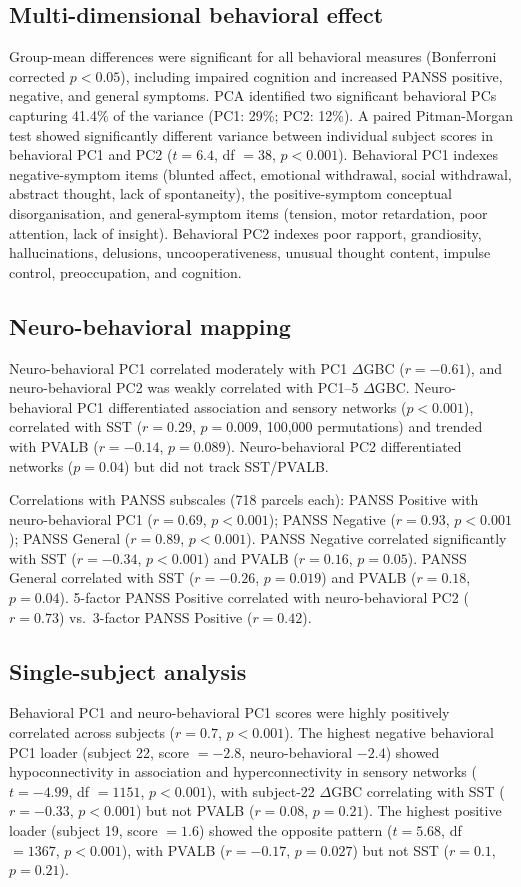\documentclass[11pt]{article}
\begin{document}
\subsection{Multi-dimensional behavioral effect}
Group-mean differences were significant for all behavioral measures (Bonferroni corrected $p<0.05$), including impaired cognition and increased PANSS positive, negative, and general symptoms. PCA identified two significant behavioral PCs capturing 41.4\% of the variance (PC1: 29\%; PC2: 12\%). A paired Pitman-Morgan test showed significantly different variance between individual subject scores in behavioral PC1 and PC2 ($t=6.4$, df $=38$, $p<0.001$). Behavioral PC1 indexes negative-symptom items (blunted affect, emotional withdrawal, social withdrawal, abstract thought, lack of spontaneity), the positive-symptom conceptual disorganisation, and general-symptom items (tension, motor retardation, poor attention, lack of insight). Behavioral PC2 indexes poor rapport, grandiosity, hallucinations, delusions, uncooperativeness, unusual thought content, impulse control, preoccupation, and cognition.

\subsection{Neuro-behavioral mapping}
Neuro-behavioral PC1 correlated moderately with PC1 $\Delta$GBC ($r=-0.61$), and neuro-behavioral PC2 was weakly correlated with PC1--5 $\Delta$GBC. Neuro-behavioral PC1 differentiated association and sensory networks ($p<0.001$), correlated with SST ($r=0.29$, $p=0.009$, 100,000 permutations) and trended with PVALB ($r=-0.14$, $p=0.089$). Neuro-behavioral PC2 differentiated networks ($p=0.04$) but did not track SST/PVALB.

Correlations with PANSS subscales (718 parcels each): PANSS Positive with neuro-behavioral PC1 ($r=0.69$, $p<0.001$); PANSS Negative ($r=0.93$, $p<0.001$); PANSS General ($r=0.89$, $p<0.001$). PANSS Negative correlated significantly with SST ($r=-0.34$, $p<0.001$) and PVALB ($r=0.16$, $p=0.05$). PANSS General correlated with SST ($r=-0.26$, $p=0.019$) and PVALB ($r=0.18$, $p=0.04$). 5-factor PANSS Positive correlated with neuro-behavioral PC2 ($r=0.73$) vs.\ 3-factor PANSS Positive ($r=0.42$).

\subsection{Single-subject analysis}
Behavioral PC1 and neuro-behavioral PC1 scores were highly positively correlated across subjects ($r=0.7$, $p<0.001$). The highest negative behavioral PC1 loader (subject 22, score $=-2.8$, neuro-behavioral $-2.4$) showed hypoconnectivity in association and hyperconnectivity in sensory networks ($t=-4.99$, df $=1151$, $p<0.001$), with subject-22 $\Delta$GBC correlating with SST ($r=-0.33$, $p<0.001$) but not PVALB ($r=0.08$, $p=0.21$). The highest positive loader (subject 19, score $=1.6$) showed the opposite pattern ($t=5.68$, df $=1367$, $p<0.001$), with PVALB ($r=-0.17$, $p=0.027$) but not SST ($r=0.1$, $p=0.21$).
\end{document}
